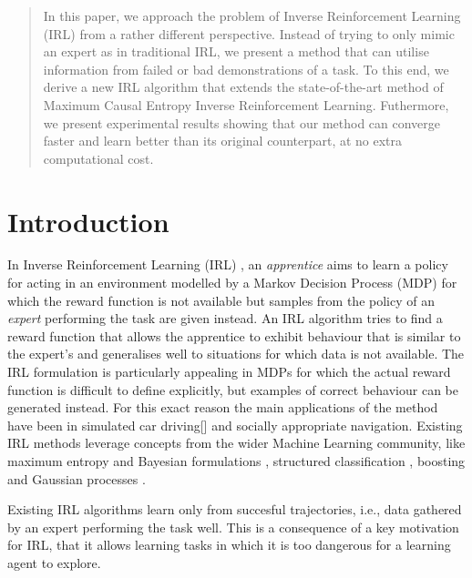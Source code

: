 \documentclass[conference]{IEEEtran}
\begin{document}
\begin{abstract}
In this paper, we approach the problem of Inverse Reinforcement Learning (IRL) from a rather different perspective. Instead of trying to only mimic an expert as in 
traditional IRL, we present a method that can utilise information from failed or bad demonstrations of a task. To this end, we derive a new IRL algorithm that extends the state-of-the-art method of Maximum Causal Entropy Inverse Reinforcement Learning.  Futhermore, we present experimental results showing that our method can converge faster and learn better than its original counterpart, at no extra computational cost. 
\end{abstract}

\IEEEpeerreviewmaketitle

\section{Introduction}
In Inverse Reinforcement Learning (IRL) \cite{ng2000algorithms}, an \emph{apprentice} aims to learn a policy for acting in an environment modelled by a Markov Decision Process (MDP) for which the reward function is not available but samples from the policy of an \emph{expert} performing the task are given instead. An IRL algorithm tries to find a reward function that allows the apprentice to exhibit behaviour  that is similar to the expert's and generalises well to situations for which data is not available. The IRL formulation is particularly appealing in MDPs for which the actual reward function is difficult to define explicitly, but examples of correct behaviour can be generated instead. For this exact reason the main applications of the method have been in simulated car driving[] and socially appropriate navigation\cite{henry2010learning,vasquez2014inverse}. Existing IRL methods leverage concepts from the wider Machine Learning community, like maximum entropy \cite{ziebart2008maximum} and Bayesian formulations \cite{ramachandran2007bayesian}, structured classification \cite{ratliff2006maximum}, boosting \cite{ratliff2007boosting} and Gaussian processes \cite{levine2011nonlinear}.

Existing IRL algorithms learn only from succesful trajectories, i.e., data gathered by an expert performing the task well.  This is a consequence of a key motivation for IRL, that it allows learning tasks in which it is too dangerous for a learning agent to explore.
\end{document}

